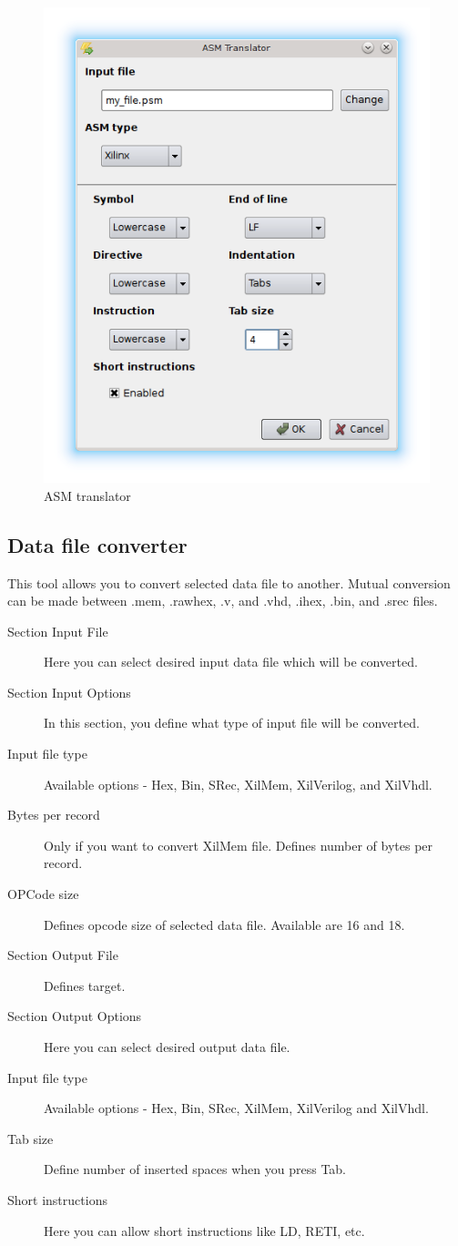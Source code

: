         \begin{figure}[h]
            \centering
            \includegraphics[width=.5\textwidth]{img/ASM_translator.png}
            \caption{ASM translator}
        \end{figure}

    \clearpage
    \subsection{Data file converter}
        This tool allows you to convert selected data file to another. Mutual conversion can be made between .mem, .rawhex, .v, and .vhd, .ihex, .bin, and .srec files.
        \begin{description}
            \item[Section Input File] Here you can select desired input data file which will be converted.
            \item[Section Input Options] In this section, you define what type of input file will be converted.
            \item[Input file type] Available options - Hex, Bin, SRec, XilMem, XilVerilog, and XilVhdl.
            \item[Bytes per record] Only if you want to convert XilMem file. Defines number of bytes per record.
            \item[OPCode size] Defines opcode size of selected data file. Available are 16 and 18.
            \item[Section Output File] Defines target.
            \item[Section Output Options] Here you can select desired output data file.
            \item[Input file type] Available options - Hex, Bin, SRec, XilMem, XilVerilog and XilVhdl.
            \item[Tab size]  Define number of inserted spaces when you press Tab.
            \item[Short instructions] Here you can allow short instructions like LD, RETI, etc.
        \end{description}

